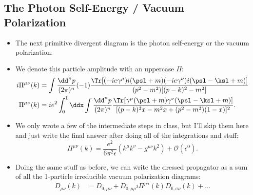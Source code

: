 \subsection*{The Photon Self-Energy / Vacuum Polarization}

\begin{itemize}
    \item The next primitive divergent diagram is the photon self-energy or the vacuum polarization:
    \begin{center}
    \end{center}
    \item We denote this particle amplitude with an uppercase $\Pi$:
        \begin{align}
            i\Pi^{\mu\nu}(k) &= \int \frac{\dd^n p}{(2\pi)^n} (-1) \frac{\Tr[(-ie\gamma^{\mu})i(\psl + m)(-ie\gamma^{\nu})i(\psl - \ksl + m)]}{(p^2 - m^2)[(p-k)^2 - m^2]} \\
            \Pi^{\mu\nu}(k) &= ie^2 \int_0^1 \ddx \int \frac{\dd^n p}{(2\pi)^n} \frac{\Tr[\gamma^{\mu}(\psl + m)\gamma^{\nu}(\psl - \ksl + m)]}{[(p-k)^2x - m^2x + (p^2-m^2)(1-x)]^2}.
        \end{align}
    \item We only wrote a few of the intermediate steps in class, but I'll skip them here and just write the final answer after doing all of the integrations and stuff:
        \begin{equation}
            \Pi^{\mu\nu}(k) = \frac{e^2}{6\pi^2\epsilon}(k^{\mu}k^{\nu} - g^{\mu\nu}k^2) + \mathcal{O}(\epsilon^0).
        \end{equation}
    \item Doing the same stuff as before, we can write the dressed propagator as a sum of all the 1-particle irreducible vacuum polarization diagrams:
        \begin{align}
            D_{\mu\nu}(k) &= D_{0,\mu\nu} + D_{0,\mu\rho} i\Pi^{\rho\sigma}(k) D_{0,\sigma\nu}(k) + \ldots \\

\end{align}
\end{itemize}
